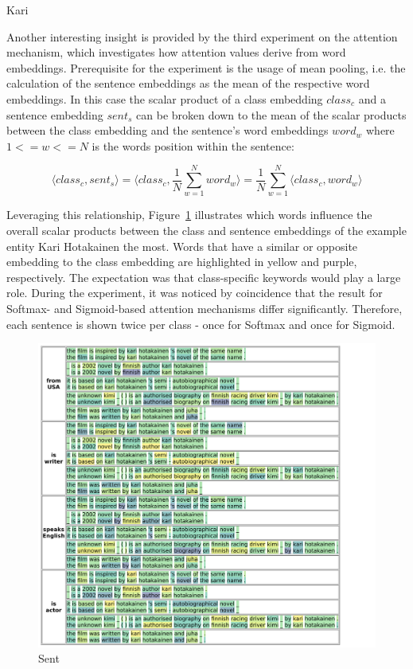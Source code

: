 \begin{table}[h]
    \centering
    
    \caption{Kari}
    \label{tab:5_experiments/4_texter/2_static/9_attention/kari}
\end{table}

Another interesting insight is provided by the third experiment on the attention mechanism, which investigates how attention values derive from word embeddings. Prerequisite for the experiment is the usage of mean pooling, i.e. the calculation of the sentence embeddings as the mean of the respective word embeddings. In this case the scalar product of a class embedding $class_c$ and a sentence embedding $sent_s$ can be broken down to the mean of the scalar products between the class embedding and the sentence's word embeddings $word_w$ where $1 <= w <= N$ is the words position within the sentence:

\[
    \langle class_c, sent_s \rangle
    = \langle class_c, \frac{1}{N} \sum_{w=1}^N word_w \rangle
    = \frac{1}{N} \sum_{w=1}^N \langle class_c, word_w \rangle
\]

Leveraging this relationship, Figure~\ref{fig:5_experiments/4_texter/2_static/9_attention/kari_softmax} illustrates which words influence the overall scalar products between the class and sentence embeddings of the example entity Kari Hotakainen the most. Words that have a similar or opposite embedding to the class embedding are highlighted in yellow and purple, respectively. The expectation was that class-specific keywords would play a large role. During the experiment, it was noticed by coincidence that the result for Softmax- and Sigmoid-based attention mechanisms differ significantly. Therefore, each sentence is shown twice per class - once for Softmax and once for Sigmoid.

\begin{figure}
    \centering
    \includegraphics[width=\textwidth]{5_experiments/4_texter/2_static/9_attention/kari_softmax}
    \caption{Sent}
    \label{fig:5_experiments/4_texter/2_static/9_attention/kari_softmax}
\end{figure}


